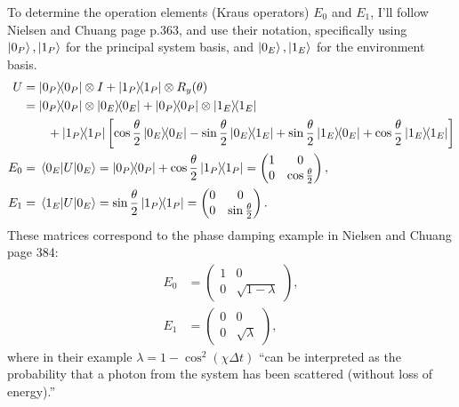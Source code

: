 \documentclass[12pt]{extarticle}
\begin{document}
To determine the operation elements (Kraus operators) $E_0$ and $E_1$,
I'll follow Nielsen and Chuang\cite{nielsen2016} page p.363,
and use their notation, specifically using $\ket{0_P},\ket{1_P}$ for the principal system basis, and $\ket{0_E},\ket{1_E}$ for the environment basis.
\begin{align*}
U & = \outerproduct{0_P}{0_P} \otimes I + \outerproduct{1_P}{1_P} \otimes R_y(\theta) \\
& = \outerproduct{0_P}{0_P} \otimes \outerproduct{0_E}{0_E} + \outerproduct{0_P}{0_P} \otimes \outerproduct{1_E}{1_E} \\
& \qquad + \outerproduct{1_P}{1_P} \left[ \cos\frac{\theta}{2} \outerproduct{0_E}{0_E} - \sin\frac{\theta}{2} \outerproduct{0_E}{1_E} + \sin\frac{\theta}{2} \outerproduct{1_E}{0_E} + \cos\frac{\theta}{2} \outerproduct{1_E}{1_E} \right] \\
E_0 & = \mel{0_E}{U}{0_E} = \outerproduct{0_P}{0_P} + \cos\frac{\theta}{2} \outerproduct{1_P}{1_P}
= \begin{pmatrix}1 & 0 \\ 0 & \cos\frac{\theta}{2}\end{pmatrix}, \\
E_1 & = \mel{1_E}{U}{0_E} = \sin\frac{\theta}{2} \outerproduct{1_P}{1_P}
= \begin{pmatrix}0 & 0 \\ 0 & \sin\frac{\theta}{2}\end{pmatrix}.
\end{align*}
These matrices correspond to the phase damping example in Nielsen and Chuang page 384:
\begin{align*}
E_0 & = \begin{pmatrix}1 & 0 \\ 0 & \sqrt{1-\lambda}\end{pmatrix}, \\
E_1 & = \begin{pmatrix}0 & 0 \\ 0 & \sqrt{\lambda}\end{pmatrix},
\end{align*}
where in their example $\lambda = 1 - \cos^2(\chi\Delta t)$ ``can be interpreted as the probability that a photon from the system has been scattered (without loss of energy).''
\end{document}
